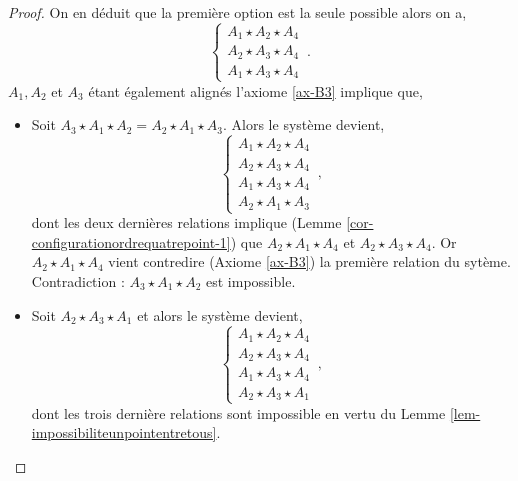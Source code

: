 \begin{cor}
\begin{proof}
        On en déduit que la première option est la seule possible alors on a,
        \begin{equation*}
            \left\{
            \begin{array}{c}
                 A_1 \star A_2 \star A_4 \\
                 A_2 \star A_3 \star A_4 \\
                 A_1 \star A_3 \star A_4 
            \end{array}
            \right. \,.
        \end{equation*}
        $A_1,A_2$ et $A_3$ étant également alignés l'axiome \ref{ax-B3} implique que, 
        \begin{itemize}[$\bullet$]
            \item Soit $A_3 \star A_1 \star A_2 = A_2 \star A_1 \star A_3$. Alors le système devient,
            \begin{equation*}
            \left\{
            \begin{array}{c}
                 A_1 \star A_2 \star A_4 \\
                 A_2 \star A_3 \star A_4 \\
                 A_1 \star A_3 \star A_4 \\
                 A_2 \star A_1 \star A_3
            \end{array}
            \right. \,,
            \end{equation*}
            dont les deux dernières relations implique (Lemme \ref{cor-configurationordrequatrepoint-1}) que $A_2 \star A_1 \star A_4$ et $A_2 \star A_3 \star A_4$. Or $A_2 \star A_1 \star A_4$ vient contredire (Axiome \ref{ax-B3}) la première relation du sytème. Contradiction : $A_3 \star A_1 \star A_2$ est impossible.
            \item Soit $A_2 \star A_3 \star A_1$ et alors le système devient,
            \begin{equation*}
            \left\{
            \begin{array}{c}
                 A_1 \star A_2 \star A_4 \\
                 A_2 \star A_3 \star A_4 \\
                 A_1 \star A_3 \star A_4 \\
                 A_2 \star A_3 \star A_1
            \end{array}
            \right. \,,
            \end{equation*}
            dont les trois dernière relations sont impossible en vertu du Lemme \ref{lem-impossibiliteunpointentretous}.

\end{itemize}
\end{proof}
\end{cor}
